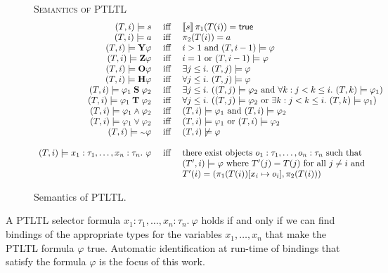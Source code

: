 \documentclass{article}
\newcommand{\ltlform}{\varphi}
\newcommand{\ltlY}{\mathbf{Y}}
\newcommand{\ltlZ}{\mathbf{Z}}
\newcommand{\ltlO}{\mathbf{O}}
\newcommand{\ltlH}{\mathbf{H}}
\newcommand{\ltlS}{\mathrel{\mathbf{S}}}
\newcommand{\ltlT}{\mathrel{\mathbf{T}}}
\newcommand{\ltlvee}{\mathbin{\vcenter{\offinterlineskip\hbox{\hskip 0.2em$\cdot$}\vskip-0.45em\hbox{$\vee$}}}}
\newcommand{\ltlwedge}{\mathbin{\vcenter{\offinterlineskip\vskip 0.1em\hbox{\hskip 0.2em$\cdot$}\vskip-0.55em\hbox{$\wedge$}}}}
\newcommand{\ltlneg}{\mathord{\hbox{\scriptsize$\sim$}}}
\begin{document}
\begin{figure}[tb]
\textsc{Semantics of PTLTL}
\[
\begin{array}{rcl}
(T,i) \models s & \iff & \sembrack{s} \pi_1(T(i)) = \true\\
(T,i) \models a & \iff & \pi_2(T(i)) = a \\
(T,i) \models \ltlY \ltlform & \iff & i > 1 \text{ and } (T,i-1) \models \ltlform\\
(T,i) \models \ltlZ \ltlform & \iff & i = 1 \text{ or } (T,i-1) \models \ltlform\\
(T,i) \models \ltlO \ltlform & \iff & \E[j \leq i] (T,j) \models \ltlform\\
(T,i) \models \ltlH \ltlform & \iff & \A[j \leq i] (T,j) \models \ltlform\\
(T,i) \models \ltlform_1 \ltlS \ltlform_2 & \iff & \E[j \leq i] ((T,j) \models \ltlform_2 \text{ and } \A[k : j < k \leq i] (T,k) \models \ltlform_1) \\
(T,i) \models \ltlform_1 \ltlT \ltlform_2 & \iff & \A[j \leq i] ((T,j) \models \ltlform_2 \text{ or } \E[k : j < k \leq i] (T,k) \models \ltlform_1)\\
(T,i) \models \ltlform_1 \ltlwedge \ltlform_2 & \iff & (T,i) \models \ltlform_1 \text{ and } (T,i) \models \ltlform_2\\
(T,i) \models \ltlform_1 \ltlvee \ltlform_2 & \iff & (T,i) \models \ltlform_1 \text{ or } (T,i) \models \ltlform_2\\
(T,i) \models \ltlneg \ltlform & \iff & (T,i) \not\models \ltlform \\
\\
(T,i) \models x_1 : \tau_1, \ldots, x_n : \tau_n.\ \ltlform & \iff & \text{there exist objects } o_1 : \tau_1, \ldots, o_n : \tau_n \text{ such that} \\
& & (T',i) \models \ltlform \text{ where } T'(j) = T(j) \text{ for all } j \neq i \text{ and }\\
& & T'(i) = (\pi_1(T(i))[x_i \mapsto o_i], \pi_2(T(i)))
\end{array}
\]
\caption{\label{fig:ptltl-semantics}Semantics of PTLTL.}
\end{figure}

A PTLTL selector formula $x_1 : \tau_1, \ldots, x_n : \tau_n.\ \ltlform$ holds if and only if we can find bindings of the appropriate types for the variables $x_1,\ldots,x_n$ that make the PTLTL formula $\ltlform$ true.  Automatic identification at run-time of bindings that satisfy the formula $\ltlform$ is the focus of this work.
\end{document}
